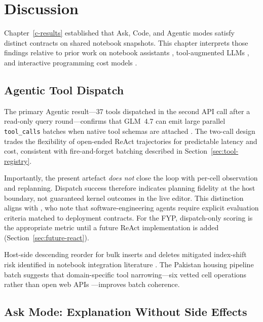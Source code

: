 \chapter{Discussion}
\label{chap:discussion}

Chapter~\ref{c-results} established that Ask, Code, and Agentic modes satisfy distinct contracts on shared notebook snapshots. This chapter interprets those findings relative to prior work on notebook assistants \parencite{mcnutt2023notebookassistants,rule2018exploration}, tool-augmented \acp{LLM} \parencite{schick2023toolformer,qin2024toolllm}, and interactive programming cost models \parencite{mozannar2024reading}.

\section{Agentic Tool Dispatch}

The primary Agentic result---37 tools dispatched in the second \ac{API} call after a read-only query round---confirms that GLM~4.7 can emit large parallel \texttt{tool\_calls} batches when native tool schemas are attached \parencite{qin2024toolllm}. The two-call design trades the flexibility of open-ended ReAct trajectories \parencite{yao2023react} for predictable latency and cost, consistent with fire-and-forget batching described in Section~\ref{sec:tool-registry}.

Importantly, the present artefact \emph{does not} close the loop with per-cell observation and replanning. Dispatch success therefore indicates planning fidelity at the host boundary, not guaranteed kernel outcomes in the live editor. This distinction aligns with \textcite{hou2024llm4se}, who note that software-engineering agents require explicit evaluation criteria matched to deployment contracts. For the FYP, dispatch-only scoring is the appropriate metric until a future ReAct implementation is added (Section~\ref{sec:future-react}).

Host-side descending reorder for bulk inserts and deletes mitigated index-shift risk identified in notebook integration literature \parencite{rule2019tenrules,chasins2018roussillon}. The Pakistan housing pipeline batch suggests that domain-specific tool narrowing---six vetted cell operations rather than open web APIs \parencite{patil2023gorilla}---improves batch coherence.

\section{Ask Mode: Explanation Without Side Effects}

